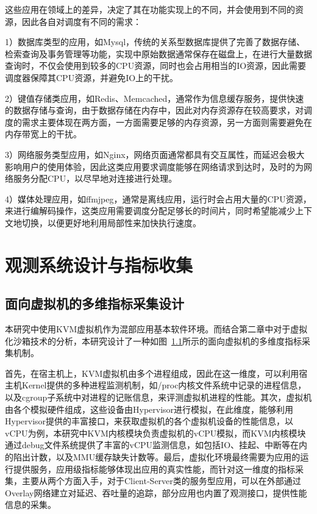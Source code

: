 这些应用在领域上的差异，决定了其在功能实现上的不同，并会使用到不同的资源，因此各自对调度有不同的需求：

1）数据库类型的应用，如Mysql，传统的关系型数据库提供了完善了数据存储、检索查询及事务管理等功能，实现中原始数据通常保存在磁盘上，在进行大量数据查询时，不仅会使用到较多的CPU资源，同时也会占用相当的IO资源，因此需要调度器保障其CPU资源，并避免IO上的干扰。

2）键值存储类应用，如Redis、Memcached，通常作为信息缓存服务，提供快速的数据存储与查询，由于数据存储在内存中，因此对内存资源存在较高要求，对调度的需求主要体现在两方面，一方面需要足够的内存资源，另一方面则需要避免在内存带宽上的干扰。

3）网络服务类型应用，如Nginx，网络页面通常都具有交互属性，而延迟会极大影响用户的使用体验，因此这类应用要求调度能够在网络请求到达时，及时的为网络服务分配CPU，以尽早地对连接进行处理。

4）媒体处理应用，如ffmjpeg，通常是离线应用，运行时会占用大量的CPU资源，来进行编解码操作，这类应用需要调度分配足够长的时间片，同时希望能减少上下文地切换，以便更好地利用局部性来加快执行速度。

\section{观测系统设计与指标收集}

\subsection{面向虚拟机的多维指标采集设计}


本研究中使用KVM虚拟机作为混部应用基本软件环境。而结合第二章中对于虚拟化沙箱技术的分析，本研究设计了一种如图~\ref{}所示的面向虚拟机的多维度指标采集机制。

首先，在宿主机上，KVM虚拟机由多个进程组成，因此在这一维度，可以利用宿主机Kernel提供的多种进程监测机制，如/proc内核文件系统中记录的进程信息，以及cgroup子系统中对进程的记账信息，来评测虚拟机进程的性能。其次，虚拟机由各个模拟硬件组成，这些设备由Hypervisor进行模拟，在此维度，能够利用Hypervisor提供的丰富接口，来获取虚拟机的各个虚拟机设备的性能信息，以vCPU为例，本研究中KVM内核模块负责虚拟机的vCPU模拟，而KVM内核模块通过debug文件系统提供了丰富的vCPU监测信息，如包括IO、挂起、中断等在内的陷出计数，以及MMU缓存缺失计数等。最后，虚拟化环境最终需要为应用的运行提供服务，应用级指标能够体现出应用的真实性能，而针对这一维度的指标采集，主要从两个方面入手，对于Client-Server类的服务型应用，可以在外部通过Overlay网络建立对延迟、吞吐量的追踪，部分应用也内置了观测接口，提供性能信息的采集。


